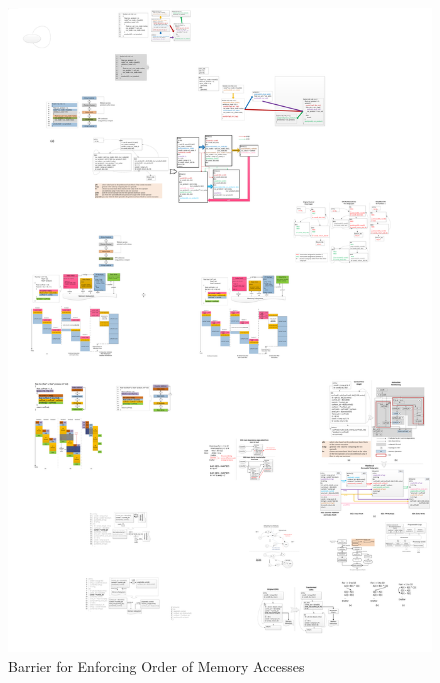 \begin{figure}[htp]
\begin{center}
\includegraphics[width=1.0\linewidth]{chap3fig/barrier.pdf}
\caption{Barrier for Enforcing Order of Memory Accesses
\label{fig:barrier}}
\end{center}
\end{figure}

